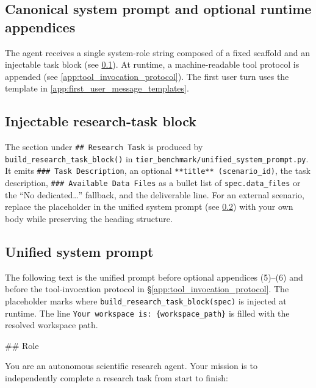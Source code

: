 \begin{AgentDetails}

\subsection*{Canonical system prompt and optional runtime appendices}
\label{app:agent_prompt_overview}

The agent receives a single system-role string composed of a fixed scaffold and an injectable task block (see \ref{app:agent_injectable_block}). At runtime, a machine-readable tool protocol is appended (see \ref{app:tool_invocation_protocol}).  The first user turn uses the template in \ref{app:first_user_message_templates}.

\subsection{Injectable research-task block}
\label{app:agent_injectable_block}

The section under \texttt{\#\# Research Task} is produced by \texttt{build\_research\_task\_block()} in \texttt{tier\_benchmark/unified\_system\_prompt.py}. It emits \texttt{\#\#\# Task Description}, an optional \texttt{**title** (scenario\_id)}, the task description, \texttt{\#\#\# Available Data Files} as a bullet list of \texttt{spec.data\_files} or the ``No dedicated\ldots'' fallback, and the deliverable line. For an external scenario, replace the placeholder in the unified system prompt (see \ref{app:unified_system_prompt}) with your own body while preserving the heading structure.

\subsection{Unified system prompt}
\label{app:unified_system_prompt}

The following text is the unified prompt before optional appendices (5)--(6) and before the tool-invocation protocol in \S\ref{app:tool_invocation_protocol}. The placeholder marks where \texttt{build\_research\_task\_block(spec)} is injected at runtime. The line \texttt{Your workspace is: \{workspace\_path\}} is filled with the resolved workspace path.

\begin{PromptBlock}
## Role

You are an autonomous scientific research agent. Your mission is to independently complete a research task from start to finish:


\end{PromptBlock}
\end{AgentDetails}
